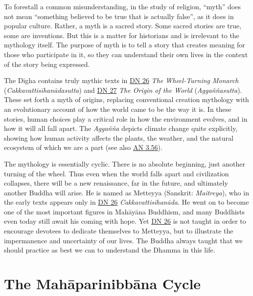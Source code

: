 \documentclass[12pt,openany]{book}%
\begin{document}
To forestall a common misunderstanding, in the study of religion, “myth” does not mean “something believed to be true that is actually false”, as it does in popular culture. Rather, a myth is a sacred story. Some sacred stories are true, some are inventions. But this is a matter for historians and is irrelevant to the mythology itself. The purpose of myth is to tell a story that creates meaning for those who participate in it, so they can understand their own lives in the context of the story being expressed.

The \textsanskrit{Dīgha} contains truly mythic texts in \href{https://suttacentral.net/dn26}{DN 26} \textit{The Wheel-Turning Monarch} (\textit{\textsanskrit{Cakkavattisīhanādasutta}}) and \href{https://suttacentral.net/dn27}{DN 27} \textit{The Origin of the World} (\textit{\textsanskrit{Aggaññasutta}}). These set forth a myth of origins, replacing conventional creation mythology with an evolutionary account of how the world came to be the way it is. In these stories, human choices play a critical role in how the environment evolves, and in how it will all fall apart. The \textit{\textsanskrit{Aggañña}} depicts climate change quite explicitly, showing how human activity affects the plants, the weather, and the natural ecosystem of which we are a part (see also \href{https://suttacentral.net/an3.56}{AN 3.56}).

The mythology is essentially cyclic. There is no absolute beginning, just another turning of the wheel. Thus even when the world falls apart and civilization collapses, there will be a new renaissance, far in the future, and ultimately another Buddha will arise. He is named as Metteyya (Sanskrit: \textit{Maitreya}), who in the early texts appears only in \href{https://suttacentral.net/dn26}{DN 26} \textit{\textsanskrit{Cakkavattisīhanāda}}. He went on to become one of the most important figures in \textsanskrit{Mahāyāna} Buddhism, and many Buddhists even today still await his coming with hope. Yet \href{https://suttacentral.net/dn26}{DN 26} is not taught in order to encourage devotees to dedicate themselves to Metteyya, but to illustrate the impermanence and uncertainty of our lives. The Buddha always taught that we should practice as best we can to understand the Dhamma in this life.

\section*{The \textsanskrit{Mahāparinibbāna} Cycle}
\end{document}

